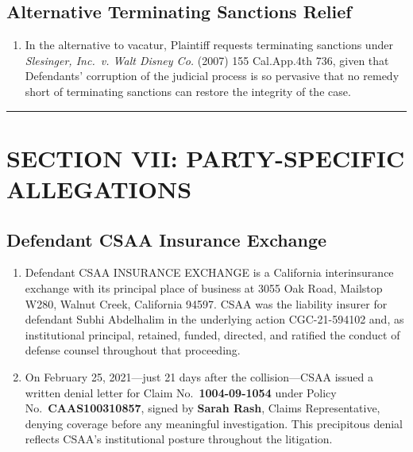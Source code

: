 \subsection{Alternative Terminating Sanctions Relief}\label{alternative-terminating-sanctions-relief}

\begin{enumerate}
\def\labelenumi{\arabic{enumi}.}
\setcounter{enumi}{38}
\tightlist
\item
  In the alternative to vacatur, Plaintiff requests terminating sanctions under \emph{Slesinger, Inc.~v. Walt Disney Co.} (2007) 155 Cal.App.4th 736, given that Defendants' corruption of the judicial process is so pervasive that no remedy short of terminating sanctions can restore the integrity of the case.
\end{enumerate}

\begin{center}\rule{0.5\linewidth}{0.5pt}\end{center}

\label{toc:section-vii-partyspecific-allegations}
\section{SECTION VII: PARTY-SPECIFIC ALLEGATIONS}\label{section-vii-party-specific-allegations}

\subsection{Defendant CSAA Insurance Exchange}\label{defendant-csaa-insurance-exchange}

\begin{enumerate}
\def\labelenumi{\arabic{enumi}.}
\setcounter{enumi}{39}
\item
  Defendant CSAA INSURANCE EXCHANGE is a California interinsurance exchange with its principal place of business at 3055 Oak Road, Mailstop W280, Walnut Creek, California 94597. CSAA was the liability insurer for defendant Subhi Abdelhalim in the underlying action CGC-21-594102 and, as institutional principal, retained, funded, directed, and ratified the conduct of defense counsel throughout that proceeding.
\item
  On February 25, 2021---just 21 days after the collision---CSAA issued a written denial letter for Claim No.~\textbf{1004-09-1054} under Policy No.~\textbf{CAAS100310857}, signed by \textbf{Sarah Rash}, Claims Representative, denying coverage before any meaningful investigation. This precipitous denial reflects CSAA's institutional posture throughout the litigation.
\end{enumerate}


